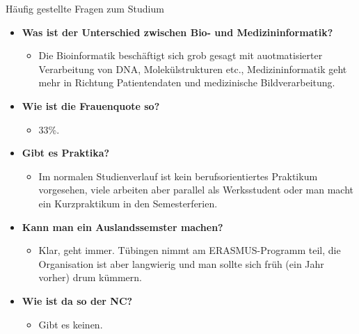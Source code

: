 \begin{block}{Häufig gestellte Fragen zum Studium}
\begin{large}
\begin{itemize}
		\item \textbf{Was ist der Unterschied zwischen Bio- und Medizininformatik?}
		\begin{itemize}
			\item Die Bioinformatik beschäftigt sich grob gesagt mit auotmatisierter Verarbeitung von DNA, Molekülstrukturen etc., Medizininformatik geht mehr in Richtung Patientendaten und medizinische Bildverarbeitung.
		\end{itemize}

	\item \textbf{Wie ist die Frauenquote so?}
	\begin{itemize}
		\item 33\%.
	\end{itemize}

	\item \textbf{Gibt es Praktika?}
	\begin{itemize}
		\item Im normalen Studienverlauf ist kein berufsorientiertes Praktikum vorgesehen, viele arbeiten aber parallel als Werksstudent oder man macht ein Kurzpraktikum in den Semesterferien.
	\end{itemize}

	\item \textbf{Kann man ein Auslandssemster machen?}
	\begin{itemize}
		\item  Klar, geht immer. Tübingen nimmt am ERASMUS-Programm teil, die Organisation ist aber langwierig und man sollte sich früh (ein Jahr vorher) drum kümmern.
	\end{itemize}

	\item \textbf{Wie ist da so der NC?}
	\begin{itemize}
		\item Gibt es keinen.
	\end{itemize}
\end{itemize}
	\end{large}
\end{block}